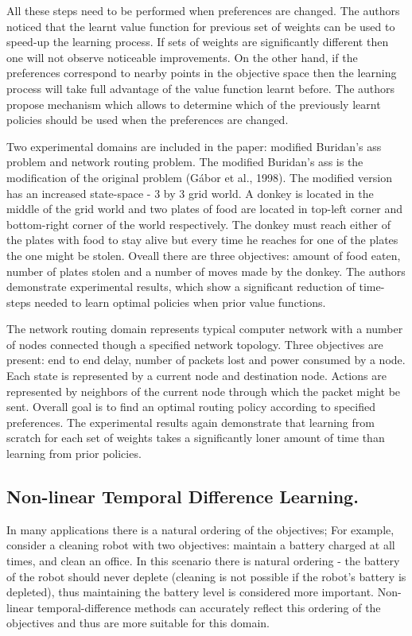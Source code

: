 All these steps need to be performed when preferences are changed. The authors noticed that the learnt value function for previous set of weights can be used to speed-up the learning process. If sets of weights are significantly different then one will not observe noticeable improvements. On the other hand, if the preferences correspond to nearby points in the objective space then the learning process will take full advantage of the value function learnt before. The authors propose mechanism which allows to determine which of the previously learnt policies should be used when the preferences are changed.

Two experimental domains are included in the paper: modified Buridan’s ass problem and network routing problem. The modified Buridan’s ass is the modification of the original problem (G{\'a}bor et al., 1998\nocite{gabor1998multi}). The modified version has an increased state-space - 3 by 3 grid world. A donkey is located in the middle of the grid world and two plates of food are located in top-left corner and bottom-right corner of the world respectively. The donkey must reach either of the plates with food to stay alive but every time he reaches for one of the plates the one might be stolen. Oveall there are three objectives: amount of food eaten, number of plates stolen and a number of moves made by the donkey. The authors demonstrate experimental results, which show a significant reduction of time-steps needed to learn optimal policies when prior value functions.

The network routing domain represents typical computer network with a number of nodes connected though a specified network topology. Three objectives are present: end to end delay, number of packets lost and power consumed by a node. Each state is represented by a current node and destination node. Actions are represented by neighbors of the current node through which the packet might be sent. Overall goal is to find an optimal routing policy according to specified preferences. The experimental results again demonstrate that learning from scratch for each set of weights takes a significantly loner amount of time than learning from prior policies.\\

\subsection{Non-linear Temporal Difference Learning.}

In many applications there is a natural ordering of the objectives; For example, consider a cleaning robot with two objectives: maintain a battery charged at all times, and clean an office. In this scenario there is natural ordering - the battery of the robot should never deplete (cleaning is not possible if the robot's battery is depleted), thus maintaining the battery level is considered more important. Non-linear temporal-difference methods can accurately reflect this ordering of the objectives and thus are more suitable for this domain.

